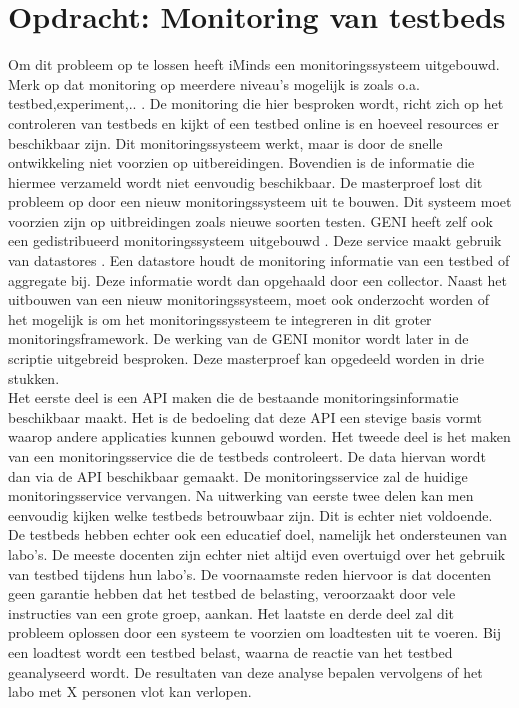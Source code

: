\section{Opdracht: Monitoring van testbeds}
\npar
Om dit probleem op te lossen heeft iMinds een monitoringssysteem uitgebouwd\citep{fed4fire-second-fed-arch}. Merk op dat monitoring op meerdere niveau's mogelijk is zoals o.a. testbed,experiment,.. . De monitoring die hier besproken wordt, richt zich op het controleren van testbeds en kijkt of een testbed online is en hoeveel resources er beschikbaar zijn. 
\npar
Dit monitoringssysteem werkt, maar is door de snelle ontwikkeling niet voorzien op uitbereidingen. Bovendien is de informatie die hiermee verzameld wordt niet eenvoudig beschikbaar. De masterproef lost dit probleem op door een nieuw monitoringssysteem uit te bouwen. Dit systeem moet voorzien zijn op uitbreidingen zoals nieuwe soorten testen.
\npar
GENI heeft zelf ook een gedistribueerd monitoringssysteem uitgebouwd \citep{geni-monitor}. Deze service maakt gebruik van datastores \citep{geni-overview}. Een datastore houdt de monitoring informatie van een testbed of aggregate bij. Deze informatie wordt dan opgehaald door een collector. Naast het uitbouwen van een nieuw monitoringssysteem, moet ook onderzocht worden of het mogelijk is om het monitoringssysteem te integreren in dit groter monitoringsframework. De werking van de GENI monitor wordt later in de scriptie uitgebreid besproken.
\npar
Deze masterproef kan opgedeeld worden in drie stukken. \\
Het eerste deel is een API maken die de bestaande monitoringsinformatie beschikbaar maakt. Het is de bedoeling dat deze API een stevige basis vormt waarop andere applicaties kunnen gebouwd worden.
\npar
Het tweede deel is het maken van een monitoringsservice die de testbeds controleert. De data hiervan wordt dan via de API beschikbaar gemaakt. De monitoringsservice zal de huidige monitoringsservice vervangen.
\npar
Na uitwerking van eerste twee delen kan men eenvoudig kijken welke testbeds betrouwbaar zijn. Dit is echter niet voldoende. De testbeds hebben echter ook een educatief doel, namelijk het ondersteunen van labo's. De meeste docenten zijn echter niet altijd even overtuigd over het gebruik van testbed tijdens hun labo's. De voornaamste reden hiervoor is dat docenten geen garantie hebben dat het testbed de belasting, veroorzaakt door vele instructies van een grote groep, aankan. 
\npar
Het laatste en derde deel zal dit probleem oplossen door een systeem te voorzien om loadtesten uit te voeren. Bij een loadtest wordt een testbed belast, waarna de reactie van het testbed geanalyseerd wordt. De resultaten van deze analyse bepalen vervolgens of het labo met X personen vlot kan verlopen.